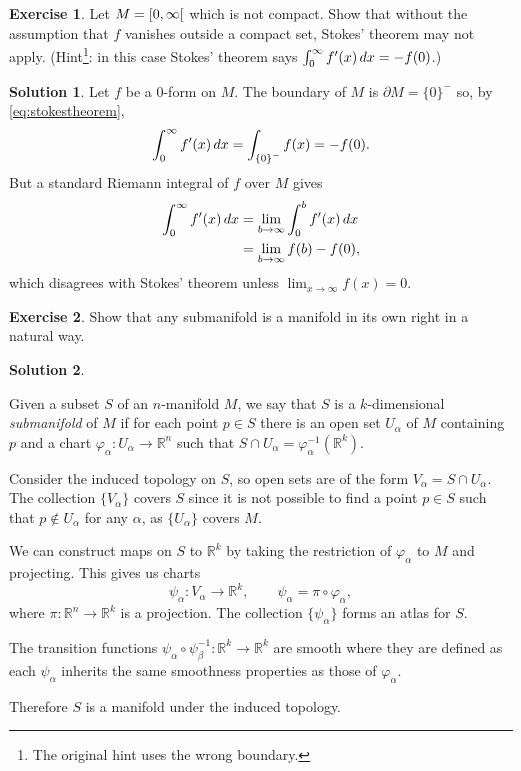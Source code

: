 \documentclass[11pt, a4paper]{report}
\theoremstyle{definition}
\newtheorem{exercise}{Exercise}[part]
\newtheorem{solution}{Solution}[part]
\newenvironment{ex}{\begin{exercise}}{\end{exercise}\pagebreak[1]}
\newenvironment{sol}{\begin{solution}}{\end{solution}\pagebreak[3]}
\newcommand*{\op}[1]{\ensuremath\mathop{}\mathopen{}#1}
\renewcommand*{\d}{\op{d}}
\begin{document}
\begin{ex}

Let $M = \rinterval{0}{\infty}$ which is not compact.
Show that without the assumption that $f$ vanishes outside a compact set, Stokes' theorem may not apply.
(Hint\footnote{The original hint uses the wrong boundary.}: in this case Stokes' theorem says $\int_0^\infty f'(x) \d x = -f(0)$.)

\end{ex}

\begin{sol}

Let $f$ be a 0-form on $M$.
The boundary of $M$ is $\partial M = {\{0\}}^-$ so, by \ref{eq:stokestheorem}, %
\[
    \int_0^\infty f'(x) \d x = \int_{{\{0\}}^-} f(x) = -f(0).
\]
But a standard Riemann integral of $f$ over $M$ gives
\begin{align*}
    \int_0^\infty f'(x) \d x &= \lim_{b \to \infty} \int_0^b f'(x) \d x \\
                             &= \lim_{b \to \infty} f(b) - f(0),
\end{align*}
which disagrees with Stokes' theorem unless $\displaystyle \lim_{x \to \infty} f(x) = 0$.

\end{sol}

\begin{ex}

Show that any submanifold is a manifold in its own right in a natural way.

\end{ex}

\begin{sol}\label{sol:submanifold}

Given a subset $S$ of an $n$-manifold $M$, we say that $S$ is a $k$-dimensional \emph{submanifold} of $M$ if for each point $p \in S$ there is an open set $U_\alpha$ of $M$ containing $p$ and a chart $\varphi_\alpha: U_\alpha \to \mathbb{R}^n$ such that $S \cap U_\alpha = \varphi_\alpha^{-1} (\mathbb{R}^k)$.

Consider the induced topology on $S$, so open sets are of the form $V_\alpha = S \cap U_\alpha$.
The collection $\{V_\alpha\}$ covers $S$ since it is not possible to find a point $p \in S$ such that $p \notin U_\alpha$ for any $\alpha$, as $\{U_\alpha\}$ covers $M$.

We can construct maps on $S$ to $\mathbb{R}^k$ by taking the restriction of $\varphi_\alpha$ to $M$ and projecting.
This gives us charts
\[
    \psi_\alpha: V_\alpha \to \mathbb{R}^k, \qquad
    \psi_\alpha = \pi \circ \varphi_\alpha,
\]
where $\pi: \mathbb{R}^n \to \mathbb{R}^k$ is a projection.
The collection $\{\psi_\alpha\}$ forms an atlas for $S$.

The transition functions $\psi_\alpha \circ \psi_\beta^{-1}: \mathbb{R}^k \to \mathbb{R}^k$ are smooth where they are defined as each $\psi_\alpha$ inherits the same smoothness properties as those of $\varphi_\alpha$.

Therefore $S$ is a manifold under the induced topology.

\end{sol}
\end{document}
